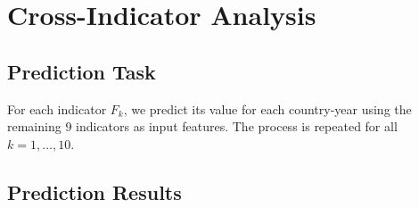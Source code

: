 \documentclass[12pt]{article}
\begin{document}
\section{Cross-Indicator Analysis}

\subsection{Prediction Task}
For each indicator $F_k$, we predict its value for each country-year using the remaining 9 indicators as input features. The process is repeated for all $k = 1, \ldots, 10$.
\subsection{Prediction Results}
\end{document}
